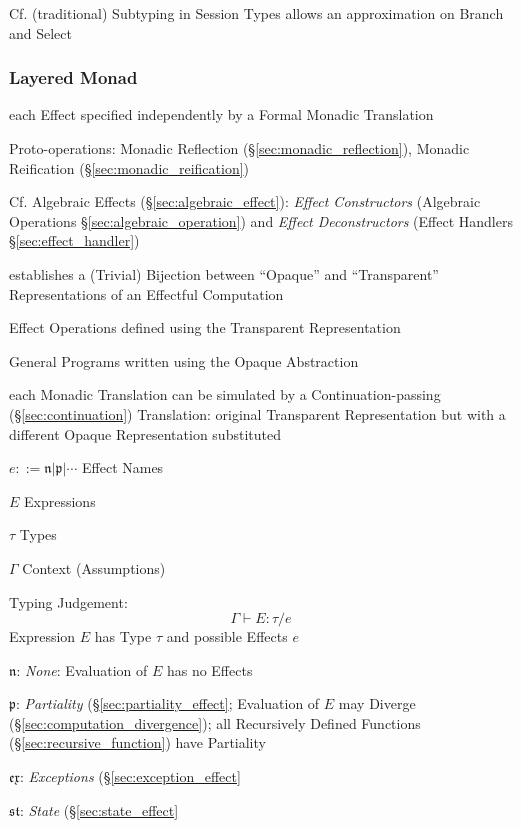 \fist Cf. (traditional) Subtyping in Session Types allows an
approximation on Branch and Select \cite{orchard-yoshida16}



\subsubsection{Layered Monad}\label{sec:layered_monad}
\cite{filinski99}

each Effect specified independently by a Formal Monadic Translation

Proto-operations: Monadic Reflection (\S\ref{sec:monadic_reflection}),
Monadic Reification (\S\ref{sec:monadic_reification})

\fist Cf. Algebraic Effects (\S\ref{sec:algebraic_effect}):
\emph{Effect Constructors} (Algebraic Operations
\S\ref{sec:algebraic_operation}) and \emph{Effect Deconstructors}
(Effect Handlers \S\ref{sec:effect_handler})


establishes a (Trivial) Bijection between ``Opaque'' and
``Transparent'' Representations of an Effectful Computation

Effect Operations defined using the Transparent Representation

General Programs written using the Opaque Abstraction

each Monadic Translation can be simulated by a Continuation-passing
(\S\ref{sec:continuation}) Translation: original Transparent
Representation but with a different Opaque Representation substituted

$e ::= \mathfrak{n} | \mathfrak{p} | \cdots$ Effect Names

$E$ Expressions

$\tau$ Types

$\Gamma$ Context (Assumptions)

Typing Judgement:
\[
  \Gamma \vdash E : \tau / e
\]
Expression $E$ has Type $\tau$ and possible Effects $e$

$\mathfrak{n}$: \emph{None}: Evaluation of $E$ has no Effects

$\mathfrak{p}$: \emph{Partiality} (\S\ref{sec:partiality_effect}; Evaluation of
$E$ may Diverge (\S\ref{sec:computation_divergence}); all Recursively Defined
Functions (\S\ref{sec:recursive_function}) have Partiality

$\mathfrak{ex}$: \emph{Exceptions} (\S\ref{sec:exception_effect}

$\mathfrak{st}$: \emph{State} (\S\ref{sec:state_effect}

